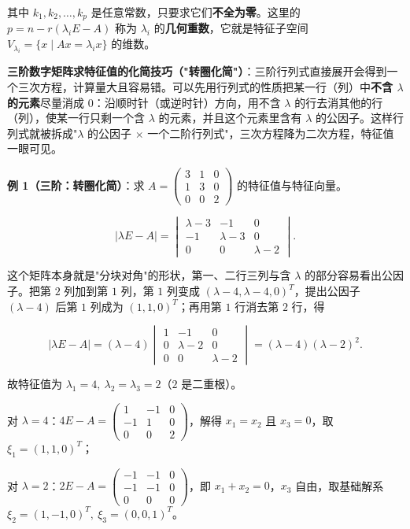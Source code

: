 \documentclass[11pt,openany,UTF8]{ctexbook}
\begin{document}
其中 $k_1,k_2,\dots,k_p$ 是任意常数，只要求它们\textbf{不全为零}。这里的 $p=n-r(\lambda_iE-A)$ 称为 $\lambda_i$ 的\textbf{几何重数}，它就是特征子空间 $V_{\lambda_i}=\{x\mid Ax=\lambda_ix\}$ 的维数。

\textbf{三阶数字矩阵求特征值的化简技巧（"转圈化简"）}：三阶行列式直接展开会得到一个三次方程，计算量大且容易错。可以先用行列式的性质把某一行（列）中\textbf{不含 $\lambda$ 的元素}尽量消成 $0$：沿顺时针（或逆时针）方向，用不含 $\lambda$ 的行去消其他的行（列），使某一行只剩一个含 $\lambda$ 的元素，并且这个元素里含有 $\lambda$ 的公因子。这样行列式就被拆成"$\lambda$ 的公因子 $\times$ 一个二阶行列式"，三次方程降为二次方程，特征值一眼可见。

\textbf{例 1（三阶：转圈化简）}：求 $A=\begin{pmatrix}3&1&0\\1&3&0\\0&0&2\end{pmatrix}$ 的特征值与特征向量。

\[\vert\lambda E-A\vert=\begin{vmatrix}\lambda-3&-1&0\\-1&\lambda-3&0\\0&0&\lambda-2\end{vmatrix}.\]

这个矩阵本身就是"分块对角"的形状，第一、二行三列与含 $\lambda$ 的部分容易看出公因子。把第 $2$ 列加到第 $1$ 列，第 $1$ 列变成 $(\lambda-4,\lambda-4,0)^T$，提出公因子 $(\lambda-4)$ 后第 $1$ 列成为 $(1,1,0)^T$；再用第 $1$ 行消去第 $2$ 行，得

\[\vert\lambda E-A\vert=(\lambda-4)\begin{vmatrix}1&-1&0\\0&\lambda-2&0\\0&0&\lambda-2\end{vmatrix}=(\lambda-4)(\lambda-2)^2 .\]

故特征值为 $\lambda_1=4,\ \lambda_2=\lambda_3=2$（$2$ 是二重根）。

对 $\lambda=4$：$4E-A=\begin{pmatrix}1&-1&0\\-1&1&0\\0&0&2\end{pmatrix}$，解得 $x_1=x_2$ 且 $x_3=0$，取 $\xi_1=(1,1,0)^T$；

对 $\lambda=2$：$2E-A=\begin{pmatrix}-1&-1&0\\-1&-1&0\\0&0&0\end{pmatrix}$，即 $x_1+x_2=0$，$x_3$ 自由，取基础解系 $\xi_2=(1,-1,0)^T,\ \xi_3=(0,0,1)^T$。
\end{document}
